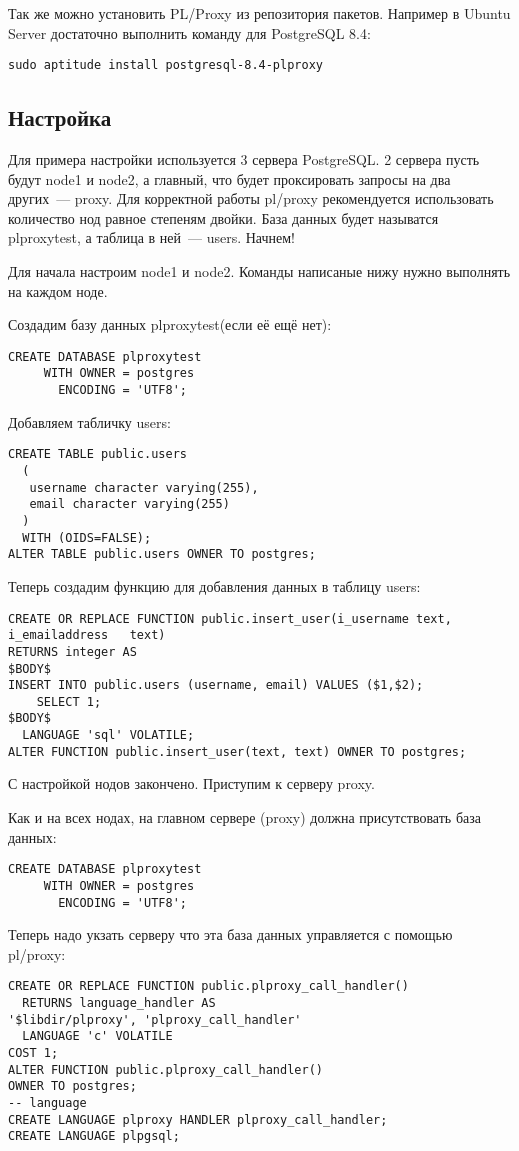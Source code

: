 Так же можно установить PL/Proxy из репозитория пакетов. 
Например в Ubuntu Server достаточно выполнить команду для PostgreSQL 8.4:
\begin{verbatim}
sudo aptitude install postgresql-8.4-plproxy
\end{verbatim}

\subsection{Настройка}
Для примера настройки используется 3 сервера PostgreSQL. 2 сервера пусть будут node1 и node2, 
а главный, что будет проксировать запросы на два других~--- proxy.
Для корректной работы pl/proxy рекомендуется использовать количество нод равное степеням двойки. 
База данных будет называтся plproxytest, а таблица в ней~--- users. Начнем!

Для начала настроим node1 и node2. Команды написаные нижу нужно выполнять на каждом ноде.

Создадим базу данных plproxytest(если её ещё нет):
\begin{verbatim}
CREATE DATABASE plproxytest
     WITH OWNER = postgres
       ENCODING = 'UTF8';
\end{verbatim}

Добавляем табличку users:
\begin{verbatim}
CREATE TABLE public.users
  (
   username character varying(255),
   email character varying(255)
  )
  WITH (OIDS=FALSE);
ALTER TABLE public.users OWNER TO postgres;
\end{verbatim}
  
Теперь создадим функцию для добавления данных в таблицу users:
\begin{verbatim}
CREATE OR REPLACE FUNCTION public.insert_user(i_username text, 
i_emailaddress   text)
RETURNS integer AS
$BODY$
INSERT INTO public.users (username, email) VALUES ($1,$2);
    SELECT 1;
$BODY$
  LANGUAGE 'sql' VOLATILE;
ALTER FUNCTION public.insert_user(text, text) OWNER TO postgres;
\end{verbatim}

С настройкой нодов закончено. Приступим к серверу proxy.

Как и на всех нодах, на главном сервере (proxy) должна присутствовать база данных: 
\begin{verbatim}
CREATE DATABASE plproxytest
     WITH OWNER = postgres
       ENCODING = 'UTF8';
\end{verbatim}

Теперь надо укзать серверу что эта база данных управляется с помощью pl/proxy:
\begin{verbatim}
CREATE OR REPLACE FUNCTION public.plproxy_call_handler()
  RETURNS language_handler AS
'$libdir/plproxy', 'plproxy_call_handler'
  LANGUAGE 'c' VOLATILE
COST 1;
ALTER FUNCTION public.plproxy_call_handler() 
OWNER TO postgres;
-- language
CREATE LANGUAGE plproxy HANDLER plproxy_call_handler;
CREATE LANGUAGE plpgsql;
\end{verbatim}

